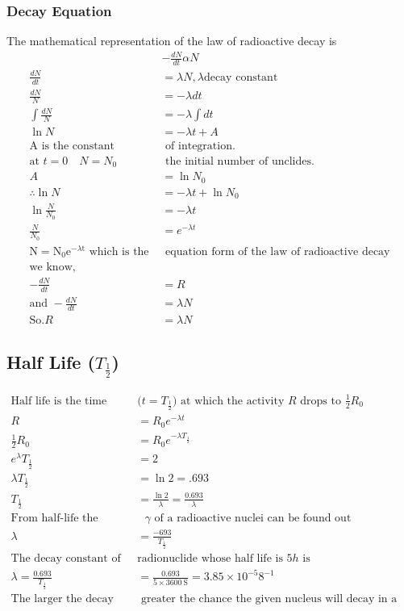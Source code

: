\subsubsection{Decay Equation}
The mathematical representation of the law of radioactive decay is 
\begin{align}
&-\frac{d N}{d t} \alpha N\\
\frac{d N}{d t}&=\lambda N, \lambda \text{decay constant}\\
\frac{d N}{N}&=-\lambda d t\\
\int \frac{d N}{N}&=-\lambda \int d t\\
\ln N&=-\lambda t+A\\
\text{A is the constant}&\text{ of integration.}\\
\text{at $t=0 \quad N=N_{0}$}&\text{ the initial number of unclides.}\\
A&=\ln N_{0}\\
\therefore \ln N&=-\lambda t+\ln N _0\\
\ln \frac{N }{ N_{0}}&=-\lambda t\\
\frac{N}{N_0}&=e^{-\lambda t}\\
\text{$\mathrm{N}=\mathrm{N}_{0} \mathrm{e}^{-\lambda \mathrm{t}}$ which is the }&\text{  equation form of the law of radioactive decay}\\
\text{we know,}\quad\\
-\frac{d N}{d t}&=R \label{nuclear decay eq}\\
\text{and }-\frac{d N}{d t}&=\lambda N\label{nuclear decay eq 2}\\
\text{So.} R&=\lambda N
\end{align}
\subsection{Half Life ($T_\frac{1}{2}$)}
\begin{align*}
\text{Half life is the time }&\text{($t=T_\frac{1}{2}$) at which the activity $R$ drops to $\frac{1}{2}R_0$}\\
R&=R_{0} e^{-\lambda t}\\
\frac{1}{2} R_{0}&=R _0 e^{-\lambda T_\frac{1}{2}}\\
e^\lambda T_\frac{1}{2}&=2\\
\lambda T_\frac{1}{2}&=\ln 2=.693\\
T_\frac{1}{2}&=\frac{\ln 2}{\lambda}=\frac{0.693}{\lambda}\\
\text{From half-life the decay constant}&\text{ $\gamma$ of a radioactive nuclei can be found out }\\
\lambda&=\frac{-693}{T_\frac{1}{2}}\\
\text{The decay constant of }&\text{radionuclide whose half life is $5 h$ is}\\
\lambda=\frac{0.693}{T _\frac{1}{2}}&=\frac{0.693}{5 \times 3600 \mathrm{~S}}=3.85 \times 10^{-5} 8^{-1}\\
\text{The larger the decay constant, the}&\text{ greater the chance the given nucleus will decay in a certain period of time}
\end{align*}
